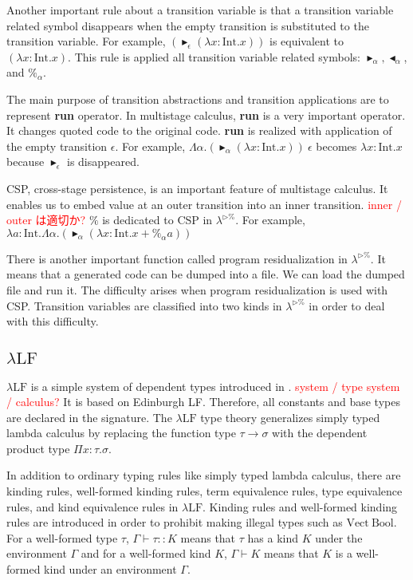 \documentclass[runningheads]{llncs}
\newcommand{\red}[1]{\textcolor{red}{#1 }}
\newcommand{\LTP}{$\lambda^{\triangleright\%}$\xspace}
\newcommand{\LLF}{$\lambda\textrm{LF}$\xspace}
\newcommand{\G}{\Gamma}
\newcommand{\TB}{\blacktriangleright}
\newcommand{\TBL}{\blacktriangleleft}
\newcommand{\I}{\textrm{Int}}
\begin{document}

Another important rule about a transition variable is 
that a transition variable related symbol disappears when the empty transition is substituted to the transition variable.
For example, $(\TB_\epsilon (\lambda x:\I.x))$ is equivalent to $(\lambda x:\I.x)$.
This rule is applied all transition variable related symbols: $\TB_\alpha, \TBL_\alpha$, and $\%_\alpha$.

The main purpose of transition abstractions and transition applications are to represent {\bf{run}} operator.
In multistage calculus, {\bf{run}} is a very important operator.
It changes quoted code to the original code.
{\bf{run}} is realized with application of the empty transition $\epsilon$.
For example, $\Lambda\alpha.(\TB_\alpha (\lambda x:\I.x))\ \epsilon$ becomes $\lambda x:\I.x$
because $\TB_\epsilon$ is disappeared.

CSP, cross-stage persistence, is an important feature of multistage calculus.
It enables us to embed value at an outer transition into an inner transition.
\red{inner / outer は適切か?}
$\%$ is dedicated to CSP in \LTP.
For example, $\lambda a:\I.\Lambda\alpha.(\TB_\alpha (\lambda x:\I.x+\%_\alpha a))$


There is another important function called program residualization in \LTP.
It means that a generated code can be dumped into a file.
We can load the dumped file and run it.
The difficulty arises when program residualization is used with CSP.
Transition variables are classified into two kinds in \LTP in order to deal with this difficulty.

\subsection{\LLF}

\LLF is a simple system of dependent types introduced in \cite{attapl}.
\red{system / type system / calculus?}
It is based on Edinburgh LF\cite{harper1993framework}.
Therefore, all constants and base types are declared in the signature.
The \LLF type theory generalizes simply typed lambda calculus
by replacing the function type $\tau\to\sigma$ with the dependent product type $\Pi x:\tau.\sigma$.

In addition to ordinary typing rules like simply typed lambda calculus,
there are kinding rules, well-formed kinding rules, term equivalence rules, type equivalence rules, and kind equivalence rules in \LLF.
Kinding rules and well-formed kinding rules are 
introduced in order to prohibit making illegal types such as $\textrm{Vect}\ \textrm{Bool}$.
For a well-formed type $\tau$, $\G \vdash \tau :: K$ means that $\tau$ has a kind $K$ under the environment $\G$ and 
for a well-formed kind $K$, $\G \vdash K$ means that $K$ is a well-formed kind under an environment $\G$.
\end{document}
